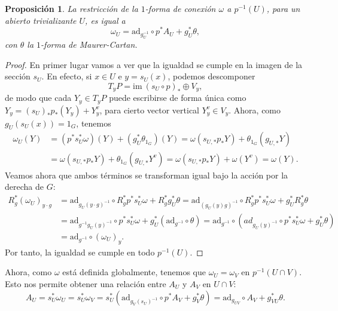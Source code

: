 \documentclass[12pt,a4paper]{article}
\newtheorem{prop}[thm]{Proposición}
\theoremstyle{definition} \newtheorem{defn}[thm]{Definición}
\theoremstyle{definition} \newtheorem{ejemplo}[thm]{Ejemplo}
\theoremstyle{definition} \newtheorem{ejercicio}[thm]{Ejercicio}
\theoremstyle{remark} \newtheorem*{obs}{Observación}
\def\ad{\mathrm{ad}}
\def\im{\mathrm{im}\ }
\begin{document}
	\begin{prop}
	  La restricción de la $1$-forma de conexión $\omega$ a $p^{-1}(U)$, para un abierto trivializante $U$, es igual a
	  \begin{equation*}
	    \omega_U=\ad_{g_U^{-1}}\circ p^*A_U+ g_U^*\theta,
	  \end{equation*}
	  con $\theta$ la $1$-forma de Maurer-Cartan.
	\end{prop}
	\begin{proof}
	  En primer lugar vamos a ver que la igualdad se cumple en la imagen de la sección $s_U$. En efecto, si $x\in U$ e $y=s_U(x)$, podemos descomponer
	  \begin{equation*}
	    T_yP=\im(s_U\circ p)_* \oplus V_y,
	  \end{equation*}
	  de modo que cada $Y_y\in T_yP$ puede escribirse de forma única como $Y_y=(s_U)_*p_*(Y_y)+Y_y^v$, para cierto vector vertical $Y_y^v\in V_y$. Ahora, como $g_U(s_U(x))=1_G$, tenemos
	  \begin{align*}
	    \omega_U(Y)&=(p^*s_U^*\omega)(Y)+(g_U^*\theta_{1_G})(Y)=\omega(s_{U,*}p_* Y) + \theta_{1_G}(g_{U,*}Y)\\ &=\omega(s_{U,*}p_* Y) + \theta_{1_G}(g_{U,*}Y^v)=\omega(s_{U,*}p_* Y) + \omega(Y^v)=\omega(Y).
	  \end{align*}
	  Veamos ahora que ambos términos se transforman igual bajo la acción por la derecha de $G$:
	  \begin{align*}
	    R_g^*(\omega_U)_{y\cdot g}&=\ad_{g_U (y\cdot g)^{-1}}\circ R_g^*p^*s_U^*\omega+R_g^*g_U^*\theta=\ad_{(g_U (y)g)^{-1}}\circ R_g^*p^*s_U^*\omega+g_U^*R_g^*\theta\\&=\ad_{g^{-1}g_U (y)^{-1}}\circ p^*s_U^*\omega+g_U^*(\ad_{g^{-1}}\circ\theta)=\ad_{g^{-1}}\circ(ad_{g_U(y)^{-1}}\circ p^*s_U^*\omega+g_U^*\theta)\\&=\ad_{g^{-1}}\circ (\omega_U)_y.
	  \end{align*}
	  Por tanto, la igualdad se cumple en todo $p^{-1}(U)$.
	\end{proof}
	Ahora, como $\omega$ está definida globalmente, tenemos que $\omega_U=\omega_V$ en $p^{-1}(U\cap V)$. Esto nos permite obtener una relación entre $A_U$ y $A_V$ en $U\cap V$:
	\begin{equation*}
	  A_U=s_U^*\omega_U=s_U^*\omega_V=s_U^*(\ad_{g_V(s_U)^{-1}}\circ p^* A_V + g_V^*\theta)= \ad_{g_{UV}}\circ A_V + g_{VU}^*\theta.
	\end{equation*}
\end{document}
